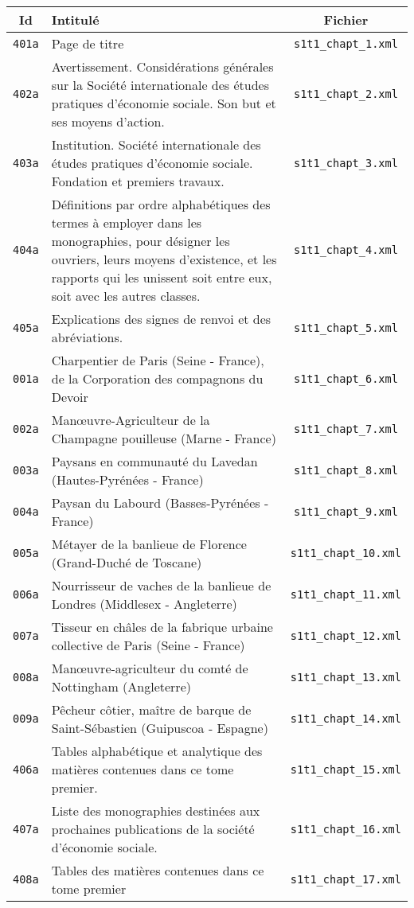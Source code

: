 \begin{center}
\begin{longtable}{ | c | p{9.5cm} | c | }
\hline
Id & Intitulé & Fichier \\ \hline
\texttt{401a} & Page de titre & \texttt{s1t1\_chapt\_1.xml} \\ \hline
\texttt{402a} & Avertissement. Considérations générales sur la Société internationale des études pratiques d'économie sociale. Son but et ses moyens d'action. & \texttt{s1t1\_chapt\_2.xml} \\ \hline
\texttt{403a} & Institution. Société internationale des études pratiques d'économie sociale. Fondation et premiers travaux. & \texttt{s1t1\_chapt\_3.xml} \\ \hline
\texttt{404a} & Définitions par ordre alphabétiques des termes à employer dans les monographies, pour désigner les ouvriers, leurs moyens d'existence, et les rapports qui les unissent soit entre eux, soit avec les autres classes. & \texttt{s1t1\_chapt\_4.xml} \\ \hline
\texttt{405a} & Explications des signes de renvoi et des abréviations. & \texttt{s1t1\_chapt\_5.xml} \\ \hline
\texttt{001a} & Charpentier de Paris (Seine - France), de la Corporation des compagnons du Devoir & \texttt{s1t1\_chapt\_6.xml} \\ \hline
\texttt{002a} & Manœuvre-Agriculteur de la Champagne pouilleuse (Marne - France) & \texttt{s1t1\_chapt\_7.xml} \\ \hline
\texttt{003a} & Paysans en communauté du Lavedan (Hautes-Pyrénées - France) & \texttt{s1t1\_chapt\_8.xml} \\ \hline
\texttt{004a} & Paysan du Labourd (Basses-Pyrénées - France) & \texttt{s1t1\_chapt\_9.xml} \\ \hline
\texttt{005a} & Métayer de la banlieue de Florence (Grand-Duché de Toscane) & \texttt{s1t1\_chapt\_10.xml} \\ \hline
\texttt{006a} & Nourrisseur de vaches de la banlieue de Londres (Middlesex - Angleterre) & \texttt{s1t1\_chapt\_11.xml} \\ \hline
\texttt{007a} & Tisseur en châles de la fabrique urbaine collective de Paris (Seine - France) & \texttt{s1t1\_chapt\_12.xml} \\ \hline
\texttt{008a} & Manœuvre-agriculteur du comté de Nottingham (Angleterre) & \texttt{s1t1\_chapt\_13.xml} \\ \hline
\texttt{009a} & Pêcheur côtier, maître de barque de Saint-Sébastien (Guipuscoa - Espagne) & \texttt{s1t1\_chapt\_14.xml} \\ \hline
\texttt{406a} & Tables alphabétique et analytique des matières contenues dans ce tome premier. & \texttt{s1t1\_chapt\_15.xml} \\ \hline
\texttt{407a} & Liste des monographies destinées aux prochaines publications de la société d'économie sociale. & \texttt{s1t1\_chapt\_16.xml} \\ \hline
\texttt{408a} & Tables des matières contenues dans ce tome premier & \texttt{s1t1\_chapt\_17.xml} \\ \hline
\end{longtable}
\end{center}

